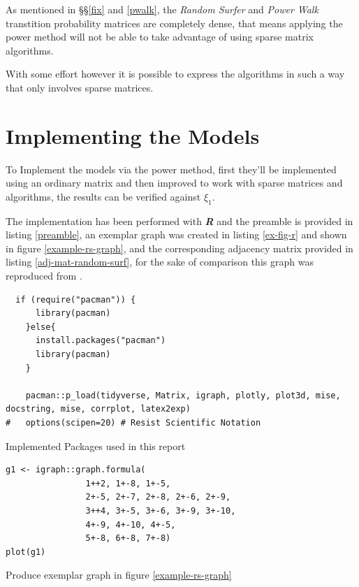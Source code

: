 \documentclass[11pt]{article}
\begin{document}
As mentioned in \S\S \ref{fix} and \ref{pwalk}, the \emph{Random Surfer} and \emph{Power Walk}
transtition probability matrices are completely dense, that means applying the
power method will not be able to take advantage of using sparse matrix
algorithms.

With some effort however it is possible to express the algorithms in such a way that only involves sparse matrices.

\section{Implementing the Models}
\label{implement_models}
To Implement the models via the power method, first they'll be implemented using
an ordinary matrix and then improved to work with sparse matrices and
algorithms, the results can be verified against \(\xi_{1}\).

The implementation has been performed with \emph{\textbf{R}} and the preamble is
provided in listing \ref{preamble}, an exemplar graph was created in listing \ref{ex-fig-r} and shown in figure \ref{example-rs-graph}, and the corresponding adjacency matrix provided in listing \ref{adj-mat-random-surf}, for the sake of comparison this graph was reproduced from \cite{parkPowerWalkRevisiting2013}.




\begin{listing}[htbp]
\begin{tcolorbox}
\begin{verbatim}
  if (require("pacman")) {
      library(pacman)
    }else{
      install.packages("pacman")
      library(pacman)
    }

    pacman::p_load(tidyverse, Matrix, igraph, plotly, plot3d, mise, docstring, mise, corrplot, latex2exp)
#   options(scipen=20) # Resist Scientific Notation
\end{verbatim}
\caption{\label{preamble}Implemented Packages used in this report}
\end{tcolorbox}
\end{listing}


\begin{listing}[htbp]
\begin{tcolorbox}
\begin{verbatim}
g1 <- igraph::graph.formula(
                1++2, 1+-8, 1+-5,
                2+-5, 2+-7, 2+-8, 2+-6, 2+-9,
                3++4, 3+-5, 3+-6, 3+-9, 3+-10,
                4+-9, 4+-10, 4+-5,
                5+-8, 6+-8, 7+-8)
plot(g1)
\end{verbatim}
\caption{\label{ex-fig-r}Produce exemplar graph in figure \ref{example-rs-graph}}
\end{tcolorbox}
\end{listing}
\end{document}
